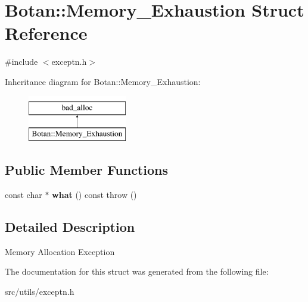 \hypertarget{structBotan_1_1Memory__Exhaustion}{\section{Botan\-:\-:Memory\-\_\-\-Exhaustion Struct Reference}
\label{structBotan_1_1Memory__Exhaustion}
}


{\ttfamily \#include $<$exceptn.\-h$>$}

Inheritance diagram for Botan\-:\-:Memory\-\_\-\-Exhaustion\-:\begin{figure}[H]
\begin{center}
\leavevmode
\includegraphics[height=2.000000cm]{structBotan_1_1Memory__Exhaustion}
\end{center}
\end{figure}
\subsection*{Public Member Functions}
\begin{DoxyCompactItemize}
\item 
\hypertarget{structBotan_1_1Memory__Exhaustion_ab651751e7371fdc03893defe5a7bcd96}{const char $\ast$ {\bfseries what} () const   throw ()}\label{structBotan_1_1Memory__Exhaustion_ab651751e7371fdc03893defe5a7bcd96}

\end{DoxyCompactItemize}


\subsection{Detailed Description}
Memory Allocation Exception 

The documentation for this struct was generated from the following file\-:\begin{DoxyCompactItemize}
\item 
src/utils/exceptn.\-h\end{DoxyCompactItemize}

